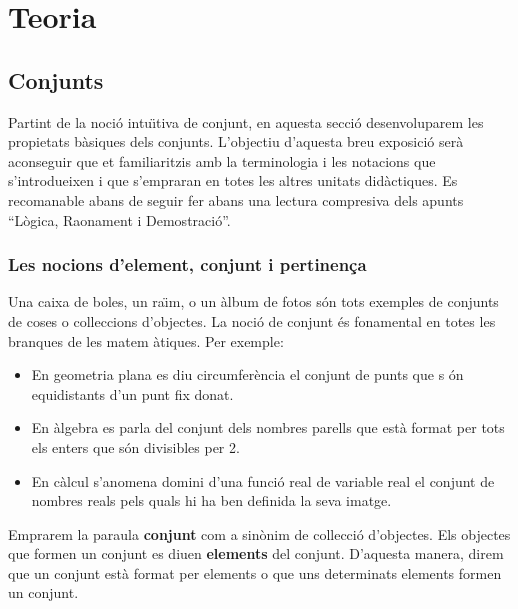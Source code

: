 \chapter{Teoria}
\label{cap:teoria}

\section{Conjunts}

Partint de la noci\'{o} intu\"{\i}tiva de conjunt, en aquesta secci\'{o}
desenvoluparem les propietats b\`{a}siques dels conjunts. L'objectiu
d'aquesta breu exposici\'{o} ser\`{a} aconseguir que et familiaritzis amb la
terminologia i les notacions que s'introdueixen i que s'empraran en totes
les altres unitats did\`{a}ctiques. Es recomanable abans de seguir fer abans
una lectura compresiva dels apunts \textquotedblleft L\`{o}gica, Raonament
i Demostraci\'{o}\textquotedblright.

\subsection{Les nocions d'element, conjunt i pertinen\c{c}a}

Una caixa de boles, un ra\"{\i}m, o un \`{a}lbum de fotos s\'{o}n tots
exemples de conjunts de coses o col\textperiodcentered leccions d'objectes.
La noci\'{o} de conjunt \'{e}s fonamental en totes les branques de les matem%
\`{a}tiques. Per exemple:

\begin{itemize}
\item En geometria plana es diu circumfer\`{e}ncia el conjunt de punts que s%
\'{o}n equidistants d'un punt fix donat.

\item En \`{a}lgebra es parla del conjunt dels nombres parells que est\`{a}
format per tots els enters que s\'{o}n divisibles per 2.

\item En c\`{a}lcul s'anomena domini d'una funci\'{o} real de variable real
el conjunt de nombres reals pels quals hi ha ben definida la seva imatge.
\end{itemize}

Emprarem la paraula \textbf{conjunt} com a sin\`{o}nim de
col\textperiodcentered lecci\'{o} d'objectes. Els objectes que formen un
conjunt es diuen \textbf{elements} del conjunt. D'aquesta manera, direm que
un conjunt est\`{a} format per elements o que uns determinats elements
formen un conjunt.

